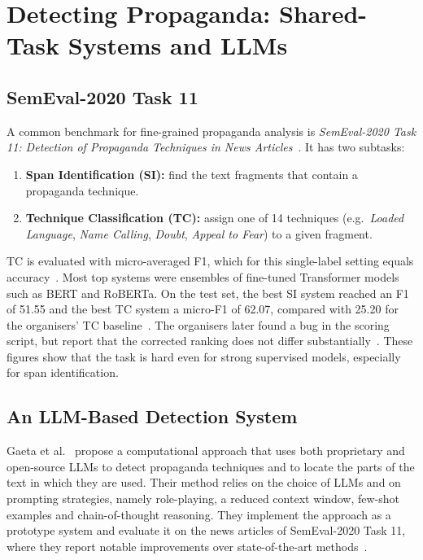 \section{Detecting Propaganda: Shared-Task Systems and LLMs}
\label{sec:propaganda_detection}

\subsection{SemEval-2020 Task 11}
A common benchmark for fine-grained propaganda analysis is \emph{SemEval-2020 Task 11: Detection of Propaganda Techniques in News Articles}~\cite{dasanmartino2020semeval}. It has two subtasks:
\begin{enumerate}
    \item \textbf{Span Identification (SI):} find the text fragments that contain a propaganda technique.
    \item \textbf{Technique Classification (TC):} assign one of 14 techniques (e.g.\ \emph{Loaded Language}, \emph{Name Calling}, \emph{Doubt}, \emph{Appeal to Fear}) to a given fragment. %
\end{enumerate}
TC is evaluated with micro-averaged F1, which for this single-label setting equals accuracy~\cite{dasanmartino2020semeval}. %
Most top systems were ensembles of fine-tuned Transformer models such as BERT and RoBERTa. On the test set, the best SI system reached an F1 of 51.55 and the best TC system a micro-F1 of 62.07, compared with 25.20 for the organisers' TC baseline~\cite{dasanmartino2020semeval}. %
The organisers later found a bug in the scoring script, but report that the corrected ranking does not differ substantially~\cite{dasanmartino2020semeval}. %
These figures show that the task is hard even for strong supervised models, especially for span identification.

\subsection{An LLM-Based Detection System}
Gaeta et al.~\cite{gaeta2025towards} propose a computational approach that uses both proprietary and open-source LLMs to detect propaganda techniques and to locate the parts of the text in which they are used. Their method relies on the choice of LLMs and on prompting strategies, namely role-playing, a reduced context window, few-shot examples and chain-of-thought reasoning. They implement the approach as a prototype system and evaluate it on the news articles of SemEval-2020 Task 11, where they report notable improvements over state-of-the-art methods~\cite{gaeta2025towards}. %

